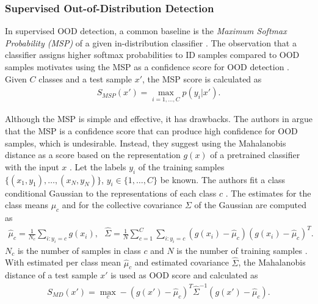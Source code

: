 \subsubsection{Supervised Out-of-Distribution Detection}
In supervised OOD detection, a common baseline is the \textit{Maximum Softmax Probability (MSP)} of a given in-distribution classifier \citep{Hendrycks2016a}.
The observation that a classifier assigns higher softmax probabilities to ID samples compared to OOD samples motivates using the MSP as a confidence score for OOD detection \citep{Hendrycks2016a}.
Given $C$ classes and a test sample $x'$, the MSP score is calculated as 
\begin{align}
	S_{MSP}(x')=\max_{i=1,\dots,C}p(y_i|x').
\end{align}	
\par
Although the MSP is simple and effective, it has drawbacks.
The authors in \citep{Lee2018} argue that the MSP is a confidence score that can produce high confidence for OOD samples, which is undesirable.
Instead, they suggest using the Mahalanobis distance as a score based on the representation $g(x)$ of a pretrained classifier with the input $x$ \citep{Lee2018}.
Let the labels $y_i$ of the training samples $\{(x_1,y_1),\dots, (x_N,y_N)\}$, $y_i \in \{1,\dots,C\}$ be known.
The authors fit a class conditional Gaussian to the representations of each class $c$ \citep{Lee2018}.
The estimates for the class means $\mu_c$ and for the collective covariance $\Sigma$ of the Gaussian are computed as \citep{Lee2018}
\begin{align}
	\hat{\mu}_c = \frac{1}{N_c}\sum_{i:y_i=c}g(x_i), \hspace{8pt} \hat{\Sigma} = \frac{1}{N}\sum_{c=1}^{C}\sum_{i: y_i=c}(g(x_i)-\hat{\mu}_c)(g(x_i)-\hat{\mu}_c)^T.
\end{align}
$N_c$ is the number of samples in class $c$ and $N$ is the number of training samples \citep{Lee2018}.
With estimated per class mean $\hat{\mu}_c$ and estimated covariance $\hat{\Sigma}$, the Mahalanobis distance of a test sample $x'$ is used as OOD score and calculated as \citep{Lee2018}
\begin{align}
	S_{MD}(x') =  \max_c -(g(x')-\hat{\mu}_c)^T\hat{\Sigma}^{-1}(g(x')-\hat{\mu}_c).
\end{align}
